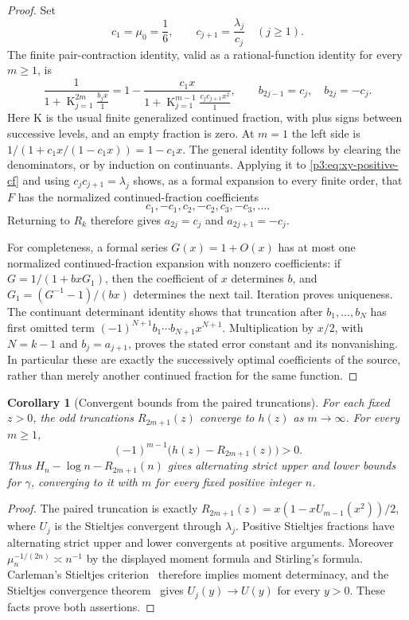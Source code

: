 \documentclass[11pt,a4paper]{article}
\newtheorem{corollary}[theorem]{Corollary}
\theoremstyle{definition}
\theoremstyle{remark}
\numberwithin{equation}{section}
\begin{document}
\begin{proof}
Set
\[
 c_1=\mu_0=\frac16,\qquad c_{j+1}=\frac{\lambda_j}{c_j}\quad(j\geq1).
\]
The finite pair-contraction identity, valid as a rational-function
identity for every $m\geq1$, is
\begin{equation}\label{p3:eq:xy-pair-contract}
 \frac{1}{1+\displaystyle\mathop{\mathrm K}_{j=1}^{2m}
                         \frac{b_jx}{1}}
 =1-\frac{c_1x}{1+\displaystyle\mathop{\mathrm K}_{j=1}^{m-1}
                         \frac{c_jc_{j+1}x^2}{1}},\qquad
 b_{2j-1}=c_j,\quad b_{2j}=-c_j.
\end{equation}
Here $\mathrm K$ is the usual finite generalized continued fraction,
with plus signs between successive levels, and an empty fraction is zero.
At $m=1$ the left side is $1/(1+c_1x/(1-c_1x))=1-c_1x$.
The general identity follows by clearing the denominators, or by
induction on continuants.
Applying it to \eqref{p3:eq:xy-positive-cf} and using $c_jc_{j+1}=\lambda_j$
shows, as a formal expansion to every finite order, that $F$ has the
normalized continued-fraction coefficients
\[
 c_1,-c_1,c_2,-c_2,c_3,-c_3,\ldots.
\]
Returning to $R_k$ therefore gives
$a_{2j}=c_j$ and $a_{2j+1}=-c_j$.

For completeness, a formal series $G(x)=1+O(x)$ has at most one
normalized continued-fraction expansion with nonzero coefficients:
if $G=1/(1+b x G_1)$, then the coefficient of $x$ determines $b$, and
$G_1=(G^{-1}-1)/(bx)$ determines the next tail.  Iteration proves
uniqueness.  The continuant determinant identity shows that truncation
after $b_1,\ldots,b_N$ has first omitted term
$(-1)^{N+1}b_1\cdots b_{N+1}x^{N+1}$.
Multiplication by $x/2$, with $N=k-1$ and $b_j=a_{j+1}$, proves the
stated error constant and its nonvanishing.  In particular these are
exactly the successively optimal coefficients of the source, rather
than merely another continued fraction for the same function.
\end{proof}

\begin{corollary}[Convergent bounds from the paired truncations]
For each fixed $z>0$, the odd truncations $R_{2m+1}(z)$ converge to
$h(z)$ as $m\to\infty$.  For every $m\geq1$,
\[
 (-1)^{m-1}\bigl(h(z)-R_{2m+1}(z)\bigr)>0.
\]
Thus $H_n-\log n-R_{2m+1}(n)$ gives alternating strict upper and lower
bounds for $\gamma$, converging to it with $m$ for every fixed positive
integer $n$.
\end{corollary}
\begin{proof}
The paired truncation is exactly
$R_{2m+1}(z)=x(1-xU_{m-1}(x^2))/2$, where $U_j$ is the
Stieltjes convergent through $\lambda_j$.  Positive Stieltjes fractions
have alternating strict upper and lower convergents at positive
arguments.  Moreover
$\mu_n^{-{1}/{(2n)}}\asymp n^{-1}$ by the displayed moment formula and
Stirling's formula.  Carleman's Stieltjes criterion~\cite{p3:Wall1948} therefore implies
moment determinacy, and the Stieltjes convergence theorem~\cite{p3:Stieltjes1894,p3:Wall1948} gives
$U_j(y)\to U(y)$ for every $y>0$.  These facts prove both assertions.
\end{proof}
\end{document}
